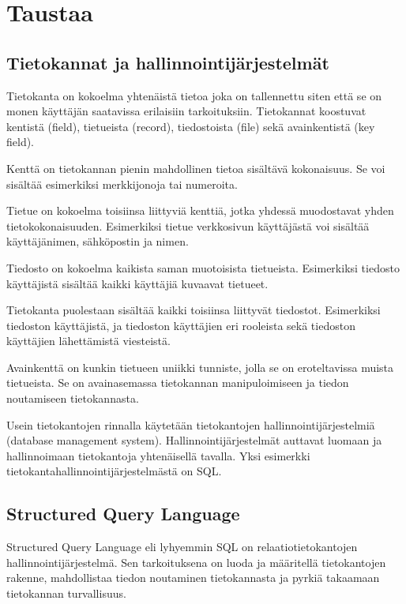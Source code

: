 \documentclass[finnish,twoside,openright]{HYgraduMLDS}
\begin{document}
\chapter{Taustaa}

\section{Tietokannat ja hallinnointijärjestelmät}

Tietokanta on kokoelma yhtenäistä tietoa joka on tallennettu siten että se on monen käyttäjän saatavissa erilaisiin tarkoituksiin\cite{pathak2007dbms}. Tietokannat koostuvat kentistä (field), tietueista (record), tiedostoista (file) sekä avainkentistä (key field).

Kenttä on tietokannan pienin mahdollinen tietoa sisältävä kokonaisuus. Se voi sisältää esimerkiksi merkkijonoja tai numeroita. 

Tietue on kokoelma toisiinsa liittyviä kenttiä, jotka yhdessä muodostavat yhden tietokokonaisuuden. Esimerkiksi tietue verkkosivun käyttäjästä voi sisältää käyttäjänimen, sähköpostin ja nimen.

Tiedosto on kokoelma kaikista saman muotoisista tietueista. Esimerkiksi tiedosto käyttäjistä sisältää kaikki käyttäjiä kuvaavat tietueet.

Tietokanta puolestaan sisältää kaikki toisiinsa liittyvät tiedostot. Esimerkiksi tiedoston käyttäjistä, ja tiedoston käyttäjien eri rooleista sekä tiedoston käyttäjien lähettämistä viesteistä.

Avainkenttä on kunkin tietueen uniikki tunniste, jolla se on eroteltavissa muista tietueista. Se on avainasemassa tietokannan manipuloimiseen ja tiedon noutamiseen tietokannasta.

Usein tietokantojen rinnalla käytetään tietokantojen hallinnointijärjestelmiä (database management system). Hallinnointijärjestelmät auttavat luomaan ja hallinnoimaan tietokantoja yhtenäisellä tavalla. Yksi esimerkki tietokantahallinnointijärjestelmästä on SQL.


\section{Structured Query Language}

Structured Query Language eli lyhyemmin SQL on relaatiotietokantojen\cite{Codd:1970:RMD:362384.362685} hallinnointijärjestelmä\cite{pathak2007dbms}. Sen tarkoituksena on luoda ja määritellä tietokantojen rakenne, mahdollistaa tiedon noutaminen tietokannasta ja pyrkiä takaamaan tietokannan turvallisuus\cite{wilton2005beginning}.
\end{document}
